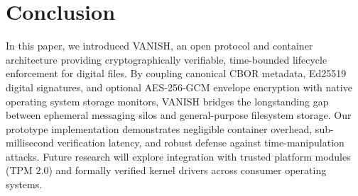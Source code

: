 \section{Conclusion}
\label{sec:conclusion}

In this paper, we introduced VANISH, an open protocol and container architecture providing cryptographically verifiable, time-bounded lifecycle enforcement for digital files. By coupling canonical CBOR metadata, Ed25519 digital signatures, and optional AES-256-GCM envelope encryption with native operating system storage monitors, VANISH bridges the longstanding gap between ephemeral messaging silos and general-purpose filesystem storage. Our prototype implementation demonstrates negligible container overhead, sub-millisecond verification latency, and robust defense against time-manipulation attacks. Future research will explore integration with trusted platform modules (TPM 2.0) and formally verified kernel drivers across consumer operating systems.
